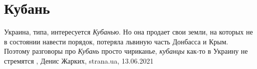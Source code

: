  
 
 
 
 
\chapter{Кубань}

Украина, типа, интересуется \emph{Кубанью}. Но она продает свои земли, на которых не в
состоянии навести порядок, потеряла львиную часть Донбасса и Крым. Поэтому
разговоры про \emph{Кубань} просто чириканье, \emph{кубанцы} как-то в Украину не стремятся
, 
Денис Жарких, strana.ua, 13.06.2021

